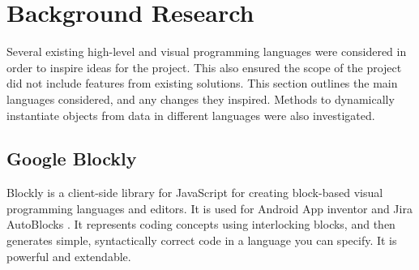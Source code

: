 \chapter{Background Research}

Several existing high-level and visual programming languages were considered in order to inspire ideas for the project. This also ensured the scope of the project did not include features from existing solutions. This section outlines the main languages considered, and any changes they inspired. Methods to dynamically instantiate objects from data in different languages were also investigated.

\section{Google Blockly}

Blockly is a client-side library for JavaScript for creating block-based visual programming languages and editors. It is used for Android App inventor and Jira AutoBlocks \cite{blockly}. It represents coding concepts using interlocking blocks, and then generates simple, syntactically correct code in a language you can specify. It is powerful and extendable.

